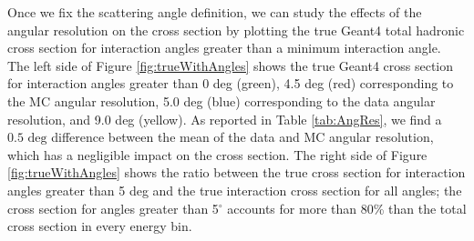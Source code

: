 Once we fix the scattering angle definition, we can study the effects of the angular resolution on the cross section by plotting the true Geant4 total hadronic cross section for interaction angles greater than a minimum interaction angle. The left side of Figure \ref{fig:trueWithAngles} shows the  true Geant4 cross section  for interaction angles greater than 0 deg (green), 4.5 deg (red) corresponding to the MC angular resolution, 5.0 deg  (blue) corresponding to the data angular resolution, and 9.0 deg (yellow).  As reported in Table \ref{tab:AngRes}, we find a $0.5 \text{ deg}$ difference between the mean of the data and MC angular resolution, which has a negligible impact on the cross section. The right side of Figure \ref{fig:trueWithAngles} shows the ratio between the  true cross section for interaction angles greater than 5 deg and the true interaction cross section for all angles;  the cross section for angles greater than 5$^\circ$ accounts for more than 80\% than the total cross section in every energy bin.


